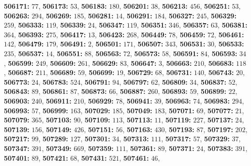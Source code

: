 \textsf{\bfseries 506171:} $77$, \textsf{\bfseries 506173:} $53$, \textsf{\bfseries 506183:} $180$, \textsf{\bfseries 506201:} $38$, \textsf{\bfseries 506213:} $456$, \textsf{\bfseries 506251:} $53$, \textsf{\bfseries 506263:} $294$, \textsf{\bfseries 506269:} $185$, \textsf{\bfseries 506281:} $14$, \textsf{\bfseries 506291:} $184$, \textsf{\bfseries 506327:} $245$, \textsf{\bfseries 506329:} $259$, \textsf{\bfseries 506333:} $119$, \textsf{\bfseries 506339:} $24$, \textsf{\bfseries 506347:} $119$, \textsf{\bfseries 506351:} $346$, \textsf{\bfseries 506357:} $63$, \textsf{\bfseries 506381:} $364$, \textsf{\bfseries 506393:} $275$, \textsf{\bfseries 506417:} $13$, \textsf{\bfseries 506423:} $268$, \textsf{\bfseries 506449:} $78$, \textsf{\bfseries 506459:} $72$, \textsf{\bfseries 506461:} $142$, \textsf{\bfseries 506479:} $179$, \textsf{\bfseries 506491:} $2$, \textsf{\bfseries 506501:} $171$, \textsf{\bfseries 506507:} $343$, \textsf{\bfseries 506531:} $30$, \textsf{\bfseries 506533:} $235$, \textsf{\bfseries 506537:} $14$, \textsf{\bfseries 506551:} $88$, \textsf{\bfseries 506563:} $72$, \textsf{\bfseries 506573:} $58$, \textsf{\bfseries 506591:} $84$, \textsf{\bfseries 506593:} $34$, \textsf{\bfseries 506599:} $249$, \textsf{\bfseries 506609:} $261$, \textsf{\bfseries 506629:} $83$, \textsf{\bfseries 506647:} $3$, \textsf{\bfseries 506663:} $210$, \textsf{\bfseries 506683:} $118$, \textsf{\bfseries 506687:} $211$, \textsf{\bfseries 506689:} $59$, \textsf{\bfseries 506699:} $19$, \textsf{\bfseries 506729:} $68$, \textsf{\bfseries 506731:} $140$, \textsf{\bfseries 506743:} $20$, \textsf{\bfseries 506773:} $24$, \textsf{\bfseries 506783:} $524$, \textsf{\bfseries 506791:} $94$, \textsf{\bfseries 506797:} $62$, \textsf{\bfseries 506809:} $34$, \textsf{\bfseries 506837:} $52$, \textsf{\bfseries 506843:} $89$, \textsf{\bfseries 506861:} $87$, \textsf{\bfseries 506873:} $66$, \textsf{\bfseries 506887:} $260$, \textsf{\bfseries 506893:} $59$, \textsf{\bfseries 506899:} $22$, \textsf{\bfseries 506903:} $240$, \textsf{\bfseries 506911:} $210$, \textsf{\bfseries 506929:} $78$, \textsf{\bfseries 506941:} $39$, \textsf{\bfseries 506963:} $74$, \textsf{\bfseries 506983:} $294$, \textsf{\bfseries 506993:} $57$, \textsf{\bfseries 506999:} $163$, \textsf{\bfseries 507029:} $185$, \textsf{\bfseries 507049:} $183$, \textsf{\bfseries 507071:} $69$, \textsf{\bfseries 507077:} $21$, \textsf{\bfseries 507079:} $365$, \textsf{\bfseries 507103:} $90$, \textsf{\bfseries 507109:} $113$, \textsf{\bfseries 507113:} $11$, \textsf{\bfseries 507119:} $227$, \textsf{\bfseries 507137:} $24$, \textsf{\bfseries 507139:} $156$, \textsf{\bfseries 507149:} $426$, \textsf{\bfseries 507151:} $56$, \textsf{\bfseries 507163:} $430$, \textsf{\bfseries 507193:} $87$, \textsf{\bfseries 507197:} $202$, \textsf{\bfseries 507217:} $99$, \textsf{\bfseries 507289:} $127$, \textsf{\bfseries 507301:} $34$, \textsf{\bfseries 507313:} $111$, \textsf{\bfseries 507317:} $57$, \textsf{\bfseries 507329:} $37$, \textsf{\bfseries 507347:} $391$, \textsf{\bfseries 507349:} $669$, \textsf{\bfseries 507359:} $111$, \textsf{\bfseries 507361:} $89$, \textsf{\bfseries 507371:} $24$, \textsf{\bfseries 507383:} $391$, \textsf{\bfseries 507401:} $89$, \textsf{\bfseries 507421:} $68$, \textsf{\bfseries 507431:} $521$, \textsf{\bfseries 507461:} $46$, 
